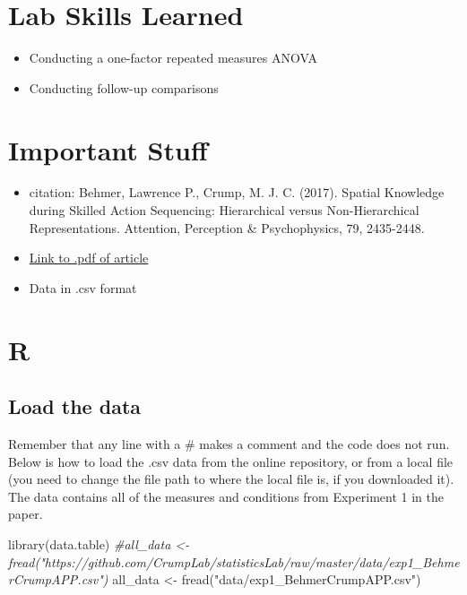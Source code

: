 \documentclass[
]{book}
\newenvironment{Shaded}{\begin{snugshade}}{\end{snugshade}}
\newcommand{\CommentTok}[1]{\textcolor[rgb]{0.56,0.35,0.01}{\textit{#1}}}
\newcommand{\FunctionTok}[1]{\textcolor[rgb]{0.00,0.00,0.00}{#1}}
\newcommand{\NormalTok}[1]{#1}
\newcommand{\OtherTok}[1]{\textcolor[rgb]{0.56,0.35,0.01}{#1}}
\newcommand{\StringTok}[1]{\textcolor[rgb]{0.31,0.60,0.02}{#1}}
\providecommand{\tightlist}{%
  \setlength{\itemsep}{0pt}\setlength{\parskip}{0pt}}
\begin{document}
\hypertarget{lab-skills-learned-3}{%
\section{Lab Skills Learned}\label{lab-skills-learned-3}}

\begin{itemize}
\tightlist
\item
  Conducting a one-factor repeated measures ANOVA
\item
  Conducting follow-up comparisons
\end{itemize}

\hypertarget{important-stuff-3}{%
\section{Important Stuff}\label{important-stuff-3}}

\begin{itemize}
\tightlist
\item
  citation: Behmer, Lawrence P., Crump, M. J. C. (2017). Spatial Knowledge during Skilled Action Sequencing: Hierarchical versus Non-Hierarchical Representations. Attention, Perception \& Psychophysics, 79, 2435-2448.
\item
  \href{https://github.com/CrumpLab/CrumpLab.github.io/raw/master/files/8753/Behmer\%20and\%20Crump\%20-\%202017.pdf}{Link to .pdf of article}
\item
  Data in .csv format
\end{itemize}

\hypertarget{r-9}{%
\section{R}\label{r-9}}

\hypertarget{load-the-data-3}{%
\subsection{Load the data}\label{load-the-data-3}}

Remember that any line with a \# makes a comment and the code does not run. Below is how to load the .csv data from the online repository, or from a local file (you need to change the file path to where the local file is, if you downloaded it). The data contains all of the measures and conditions from Experiment 1 in the paper.

\begin{Shaded}
\begin{Highlighting}[]
\FunctionTok{library}\NormalTok{(data.table)}
\CommentTok{\#all\_data \textless{}{-} fread("https://github.com/CrumpLab/statisticsLab/raw/master/data/exp1\_BehmerCrumpAPP.csv")}
\NormalTok{all\_data }\OtherTok{\textless{}{-}} \FunctionTok{fread}\NormalTok{(}\StringTok{"data/exp1\_BehmerCrumpAPP.csv"}\NormalTok{)}
\end{Highlighting}
\end{Shaded}
\end{document}
